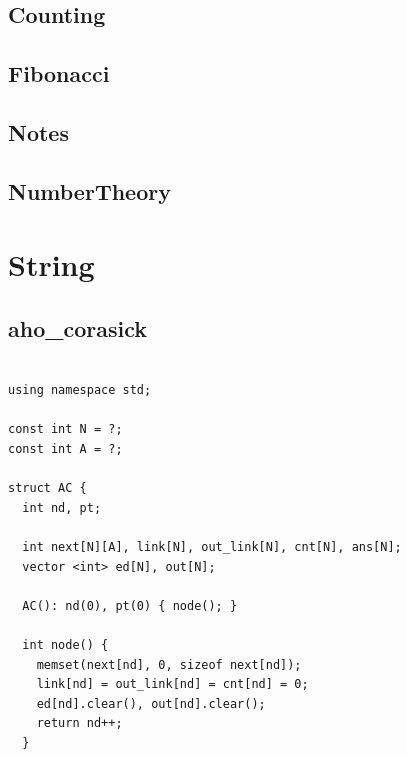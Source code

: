 \documentclass[9pt, landscape, a4paper,twosided]{extarticle}
\begin{document}
\begin{multicols*}{3}
\subsection{Counting}

\subsection{Fibonacci}

\subsection{Notes}

\subsection{NumberTheory}

\section{String}
\subsection{aho\_corasick}
\begin{verbatim}

using namespace std;

const int N = ?;
const int A = ?;

struct AC {
  int nd, pt;

  int next[N][A], link[N], out_link[N], cnt[N], ans[N];
  vector <int> ed[N], out[N];

  AC(): nd(0), pt(0) { node(); }

  int node() {
    memset(next[nd], 0, sizeof next[nd]);
    link[nd] = out_link[nd] = cnt[nd] = 0;
    ed[nd].clear(), out[nd].clear();
    return nd++;
  }


\end{verbatim}
\end{multicols*}
\end{document}
